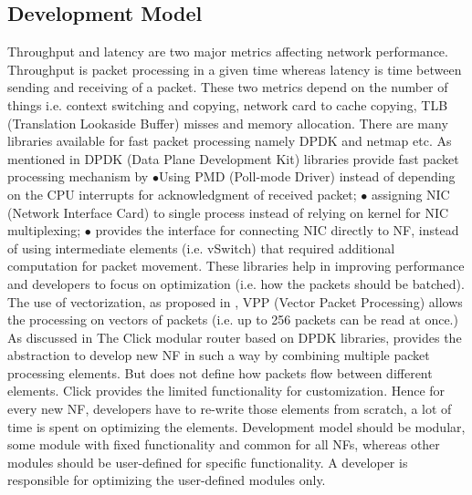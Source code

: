 \documentclass[10pt, a4paper, conference]{IEEEtran}
\begin{document}
\subsection{Development Model}
Throughput and latency are two major metrics affecting network performance. Throughput is packet processing in a given time whereas latency is time between sending and receiving of a packet. These two metrics depend on the number of things \cite{Philippov2017}i.e. context switching and copying, network card to cache copying, TLB (Translation Lookaside Buffer) misses and memory allocation. There are many libraries available for fast packet processing namely DPDK\cite{Corporation2014} and netmap etc. As mentioned in \cite{Panda2017} DPDK (Data Plane Development Kit) libraries provide fast packet processing mechanism by $\bullet$Using PMD (Poll-mode Driver) instead of depending on the CPU interrupts for acknowledgment of received packet; $\bullet$ assigning NIC (Network Interface Card) to single process instead of relying on kernel for NIC multiplexing; $\bullet$ provides the interface for connecting NIC directly to NF, instead of using intermediate elements (i.e. vSwitch) that required additional computation for packet movement. These libraries help in improving performance and developers to focus on optimization (i.e. how the packets should be batched). The use of vectorization, as proposed in \cite{Philippov2017}, VPP (Vector Packet Processing) allows the processing on vectors of packets (i.e. up to 256 packets can be read at once.) 
As discussed in \cite{Panda2017} The Click modular router \cite{Kohler2000} based on DPDK libraries, provides the abstraction to develop new NF in such a way by combining multiple packet processing elements. But does not define how packets flow between different elements. Click\cite{Martins2014} provides the limited functionality for customization. Hence for every new NF, developers have to re-write those elements from scratch, a lot of time is spent on optimizing the elements. Development model should be modular, some module with fixed functionality and common for all NFs, whereas other modules should be user-defined for specific functionality. A developer is responsible for optimizing the user-defined modules only.
\end{document}
